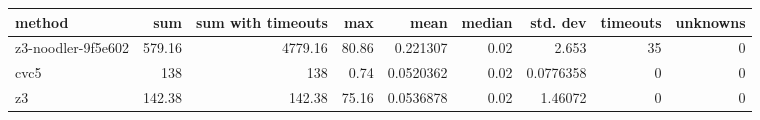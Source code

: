 \begin{tabular}{lrrrrrrrr}
\hline
 method             &    sum &   sum with timeouts &   max &      mean &   median &   std. dev &   timeouts &   unknowns \\
\hline
 z3-noodler-9f5e602 & 579.16 &             4779.16 & 80.86 & 0.221307  &     0.02 &  2.653     &         35 &          0 \\
 cvc5               & 138    &              138    &  0.74 & 0.0520362 &     0.02 &  0.0776358 &          0 &          0 \\
 z3                 & 142.38 &              142.38 & 75.16 & 0.0536878 &     0.02 &  1.46072   &          0 &          0 \\
\hline
\end{tabular}

